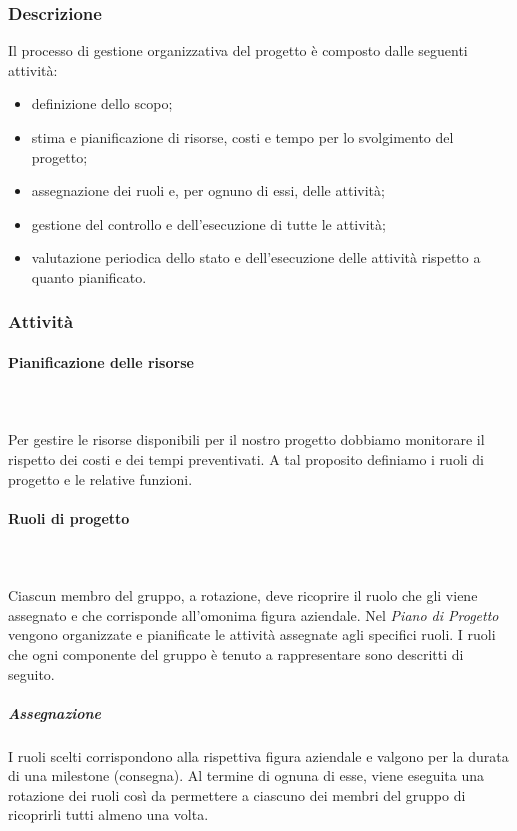 \subsubsection{Descrizione}
Il processo di gestione organizzativa del progetto è composto dalle seguenti attività: \begin{itemize}
\item definizione dello scopo;
\item stima e pianificazione di risorse, costi e tempo per lo svolgimento del progetto;
\item assegnazione dei ruoli e, per ognuno di essi, delle attività;
\item gestione del controllo e dell’esecuzione di tutte le attività;
\item valutazione periodica dello stato e dell’esecuzione delle attività rispetto a quanto pianificato.
\end{itemize}

\subsubsection{Attività}
\paragraph{Pianificazione delle risorse}\mbox{} \\ \mbox{} \\
Per gestire le risorse disponibili per il nostro progetto dobbiamo monitorare il rispetto dei costi e dei tempi preventivati. A tal proposito definiamo i ruoli di progetto e le relative funzioni.

\paragraph{Ruoli di progetto}\mbox{} \\ \mbox{} \\
Ciascun membro del gruppo, a rotazione, deve ricoprire il ruolo che gli viene assegnato e che corrisponde all'omonima figura aziendale. Nel \textit{Piano di Progetto} vengono organizzate e pianificate le attività assegnate agli specifici ruoli. I ruoli che ogni componente del gruppo è tenuto a rappresentare sono descritti di seguito.

\subparagraph*{Assegnazione}
I ruoli scelti corrispondono alla rispettiva figura aziendale e valgono per la
durata di una milestone (consegna). Al termine di ognuna di esse, viene eseguita una rotazione dei ruoli così da permettere a ciascuno dei membri del gruppo di
ricoprirli tutti almeno una volta.


